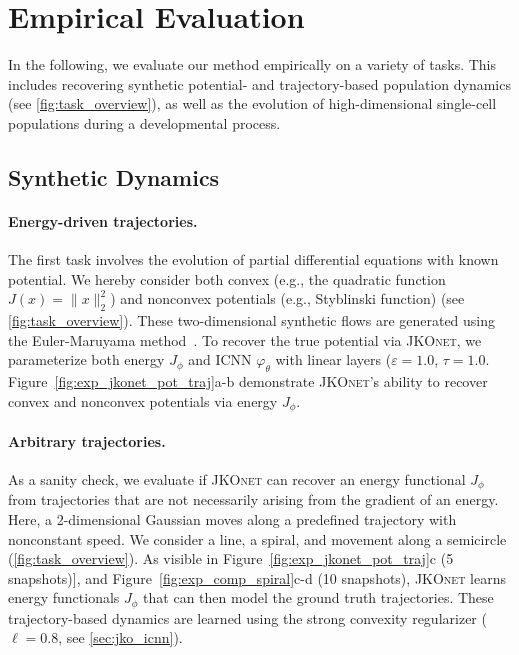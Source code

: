 \section{Empirical Evaluation} \label{sec:jkonet_evaluation}
In the following, we evaluate our method empirically on a variety of tasks. This includes recovering synthetic potential- and trajectory-based population dynamics (see \cref{fig:task_overview}), as well as the evolution of high-dimensional single-cell populations during a developmental process. 

\subsection{Synthetic Dynamics}
\label{sec:jkonet_synthetic}

\paragraph{Energy-driven trajectories.} The first task involves the evolution of partial differential equations with known potential. We hereby consider both convex (e.g., the quadratic function $J(x) = \|x\|^2_2$) and nonconvex potentials (e.g., Styblinski function) (see \cref{fig:task_overview}). These two-dimensional synthetic flows are generated using the Euler-Maruyama method~\citep{kloeden1992stochastic}. 
To recover the true potential via \textsc{JKOnet}, we parameterize both energy $J_\phi$ and ICNN $\varphi_\theta$ with linear layers ($\varepsilon = 1.0$, $\tau = 1.0$.
Figure~\ref{fig:exp_jkonet_pot_traj}a-b demonstrate \textsc{JKOnet}'s ability to recover convex and nonconvex potentials via energy $J_\phi$.

\paragraph{Arbitrary trajectories.}
As a sanity check, we evaluate if \textsc{JKOnet} can recover an energy functional $J_\phi$ from trajectories that are not necessarily arising from the gradient of an energy. Here, a 2-dimensional Gaussian moves along a predefined trajectory with nonconstant speed. 
We consider a line, a spiral, and movement along a semicircle (\cref{fig:task_overview}). As visible in Figure~\ref{fig:exp_jkonet_pot_traj}c (5 snapshots)], and Figure~\ref{fig:exp_comp_spiral}c-d (10 snapshots), \textsc{JKOnet} learns energy functionals $J_\phi$ that can then model the ground truth trajectories.
These trajectory-based dynamics are learned using the strong convexity regularizer ($\ell=0.8$, see \cref{sec:jko_icnn}).


